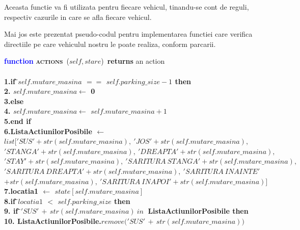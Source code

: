 \documentclass{article}
\begin{document}
Aceasta functie va fi utilizata pentru fiecare vehicul, tinandu-se cont de reguli, respectiv cazurile in care se afla fiecare vehicul.\par
Mai jos este prezentat pseudo-codul pentru implementarea functiei care verifica directiile pe care vehiculul nostru le poate realiza, conform parcarii. \\
\begin{center}
\begin{tabbing}
\large
\indent\textbf{\textcolor{blue}{func}}\=\textbf{\textcolor{blue}{tion}}
\textsc{\bfseries actions}\ {($self,stare$)}\ \textbf{returns} an action\\\\
\bfseries{1.}\indent\>\textbf{if } \=$self.mutare\_masina$ $==$ $self.parking\_size - 1$ \textbf{then} \\
\bfseries{2.}\indent\>         \> $self.mutare\_masina \leftarrow$ 0 \\
\bfseries{3.}\indent\>\textbf{else}\\
\bfseries{4.}\indent\>         \>$self.mutare\_masina \leftarrow$ $self.mutare\_masina + 1$\\
\bfseries{5.}\indent\>\textbf{end if}\\
\bfseries{6.}\indent\>\textbf{ListaActiunilorPosibile} $\leftarrow$ $list[ 'SUS' + str( self.mutare\_masina ) ,\ 'JOS' + str( self.mutare\_masina ) , $\\\indent\> $ 'STANGA' + str( self.mutare\_masina ) ,\ 'DREAPTA' + str( self.mutare\_masina ) , $ \\ \indent \> $ 'STAY' + str( self.mutare\_masina ),\ 'SARITURA\ STANGA' + str( self.mutare\_masina ),$\\\indent\>$'SARITURA\ DREAPTA' + str( self.mutare\_masina ),\ 'SARITURA\ INAINTE' $\\\indent\>$+ str( self.mutare\_masina ),\ 'SARITURA\ INAPOI' + str( self.mutare\_masina )] $\\
\bfseries{7.}\indent\>\textbf{locatia1} $\leftarrow$ $state[self.mutare\_masina]$\\
\bfseries{8.}\indent\>\textbf{if } \=$locatia1$ $<$ $self.parking\_size$ \textbf{ then}\\
\bfseries{9.}\indent\>       \>\textbf{if } \=$'SUS'$ $+$ $str(self.mutare\_masina) \ in \ $ \textbf{ListaActiunilorPosibile} \textbf{ then} \\
\bfseries{10.}\indent          \> \> \>\textbf{ListaActiunilorPosibile}.$remove('SUS'$ $+$ $str(self.mutare\_masina))$\\

\end{tabbing}
\end{center}
\end{document}
